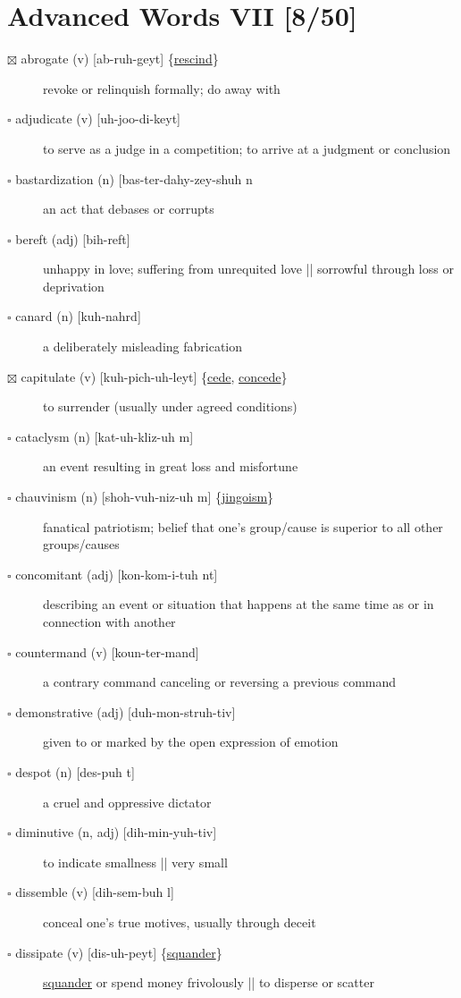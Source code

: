 \documentclass[11pt]{article}
\begin{document}
\section{Advanced Words VII [8/50]}
\label{sec:org963655b}
\begin{description}
\item[{$\boxtimes$ \label{org72c5c48}abrogate (v) [ab-ruh-geyt] \{\hyperref[orgdafbe24]{rescind}\}}] revoke or relinquish formally; do away with
\item[{$\square$ adjudicate (v) [uh-joo-di-keyt]}] to serve as a judge in a competition; to arrive at a judgment or conclusion
\item[{$\square$ bastardization (n) [bas-ter-dahy-zey-shuh n}] an act that debases or corrupts
\item[{$\square$ bereft (adj) [bih-reft]}] unhappy in love; suffering from unrequited love || sorrowful through loss or deprivation
\item[{$\square$ canard (n) [kuh-nahrd]}] a deliberately misleading fabrication
\item[{$\boxtimes$ \label{org17c47ed}capitulate (v) [kuh-pich-uh-leyt] \{\hyperref[orgd728c67]{cede}, \hyperref[orgb17c891]{concede}\}}] to surrender (usually under agreed conditions)
\item[{$\square$ cataclysm (n) [kat-uh-kliz-uh m]}] an event resulting in great loss and misfortune
\item[{$\square$ \label{org5958a49}chauvinism (n) [shoh-vuh-niz-uh m] \{\hyperref[org7961a2d]{jingoism}\}}] fanatical patriotism; belief that one's group/cause is superior to all other groups/causes
\item[{$\square$ concomitant (adj) [kon-kom-i-tuh nt]}] describing an event or situation that happens at the same time as or in connection with another
\item[{$\square$ countermand (v) [koun-ter-mand]}] a contrary command canceling or reversing a previous command
\item[{$\square$ demonstrative (adj) [duh-mon-struh-tiv]}] given to or marked by the open expression of emotion
\item[{$\square$ \label{org81a047e} \label{orga172bb4}despot (n) [des-puh t]}] a cruel and oppressive dictator
\item[{$\square$ diminutive (n, adj) [dih-min-yuh-tiv]}] to indicate smallness || very small
\item[{$\square$ dissemble (v) [dih-sem-buh l]}] conceal one's true motives, usually through deceit
\item[{$\square$ \label{org2995d4d}dissipate (v) [dis-uh-peyt] \{\hyperref[org95bc096]{squander}\}}] \hyperref[org95bc096]{squander} or spend money frivolously || to disperse or scatter

\end{description}
\end{document}
